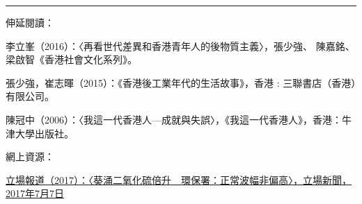 \rule[-10pt]{15cm}{0.05em}

伸延閱讀：

李立峯（2016）：〈再看世代差異和香港青年人的後物質主義〉，張少強、 陳嘉銘、梁啟智《香港社會文化系列》。

張少強，崔志暉（2015）：《香港後工業年代的生活故事》，香港 : 三聯書店（香港）有限公司。

陳冠中（2006）：〈我這一代香港人—成就與失誤〉，《我這一代香港人》，香港：牛津大學出版社。

網上資源：

\href{https://thestandnews.com/politics/遼寧號污染-葵涌二氧化硫倍升-環保署-正常波幅非偏高/}{立場報道（2017）：〈葵涌二氧化硫倍升　環保署：正常波幅非偏高〉，立場新聞，2017年7月7日}